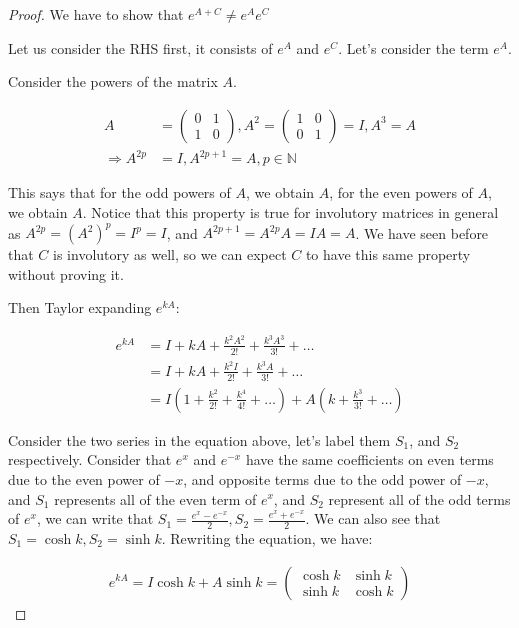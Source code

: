 \documentclass{article}
\begin{document}
\begin{proof}

We have to show that $e^{A+C} \neq e^{A}e^C$

Let us consider the RHS first, it consists of $e^A$ and $e^C$. Let's consider the term $e^A$.


Consider the powers of the matrix $A$.

\begin{align*}
A &= \begin{pmatrix}
0 & 1 \\ 1 & 0
\end{pmatrix}, 
A^2 = \begin{pmatrix}
1 & 0 \\ 0 & 1
\end{pmatrix} = I, 
A^3 = A \\
\Rightarrow A^{2p} &= I, A^{2p+1} = A, p \in \mathbb{N} 
\end{align*}

This says that for the odd powers of $A$, we obtain $A$, for the even powers of $A$, we obtain $A$. Notice that this property is true for involutory matrices in general as $A^{2p} = (A^2)^p = I^p = I$, and $A^{2p+1} = A^{2p}A = IA = A$. We have seen before that $C$ is involutory as well, so we can expect $C$ to have this same property without proving it.

Then Taylor expanding $e^{kA}$:

\begin{align*}
e^{kA} &= I + kA + \frac{k^2 A^2}{2!} + \frac{k^3A^3}{3!} + \ldots  \\
&= I + kA + \frac{k^2 I}{2!} + \frac{k^3A}{3!} + \ldots  \\
&= I(1 + \frac{k^2}{2!} + \frac{k^4}{4!} + \ldots ) + A (k + \frac{k^3}{3!} + \ldots ) 
\end{align*}

Consider the two series in the equation above, let's label them $S_1$, and $S_2$ respectively. Consider that $e^x$ and $e^{-x}$ have the same coefficients on even terms due to the even power of $-x$, and opposite terms due to the odd power of $-x$, and $S_1$ represents all of the even term of $e^x$, and $S_2$ represent all of the odd terms of $e^{x}$, we can write that $S_1 = \frac{e^{x} - e^{-x}}{2}, S_2 = \frac{e^{x} + e^{-x}}{2}$. We can also see that $S_1 = \cosh k, S_2 = \sinh k$. Rewriting the equation, we have:

\begin{align*}
e^{kA} = I \cosh k + A \sinh k = \begin{pmatrix}
\cosh k & \sinh k \\ \sinh k & \cosh k
\end{pmatrix}
\end{align*}


\end{proof}
\end{document}
